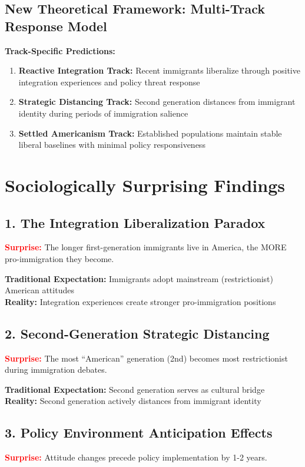 \documentclass[11pt,letterpaper]{article}
\newcommand{\surprise}[1]{\textcolor{red}{\textbf{#1}}}
\begin{document}
\subsection{New Theoretical Framework: Multi-Track Response Model}

\textbf{Track-Specific Predictions:}
\begin{enumerate}
    \item \textbf{Reactive Integration Track:} Recent immigrants liberalize through positive integration experiences and policy threat response
    \item \textbf{Strategic Distancing Track:} Second generation distances from immigrant identity during periods of immigration salience
    \item \textbf{Settled Americanism Track:} Established populations maintain stable liberal baselines with minimal policy responsiveness
\end{enumerate}

\section{Sociologically Surprising Findings}

\subsection{1. The Integration Liberalization Paradox}
\surprise{\textbf{Surprise:}} The longer first-generation immigrants live in America, the MORE pro-immigration they become.

\textbf{Traditional Expectation:} Immigrants adopt mainstream (restrictionist) American attitudes\\
\textbf{Reality:} Integration experiences create stronger pro-immigration positions

\subsection{2. Second-Generation Strategic Distancing}
\surprise{\textbf{Surprise:}} The most ``American'' generation (2nd) becomes most restrictionist during immigration debates.

\textbf{Traditional Expectation:} Second generation serves as cultural bridge\\
\textbf{Reality:} Second generation actively distances from immigrant identity

\subsection{3. Policy Environment Anticipation Effects}
\surprise{\textbf{Surprise:}} Attitude changes precede policy implementation by 1-2 years.
\end{document}
